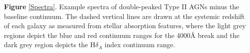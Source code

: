 \label{Spectra} \textbf{Figure} \ref{Spectra}. Example spectra of double-peaked Type II AGNs minus the baseline continuum. The dashed vertical lines are drawn at the systemic redshift of each galaxy as measured from stellar absorption features, where the light grey regions depict the blue and red continuum ranges for the $4000Å$ break and the dark grey region depicts the $\text{H}\delta_{A}$ index continuum range.
  